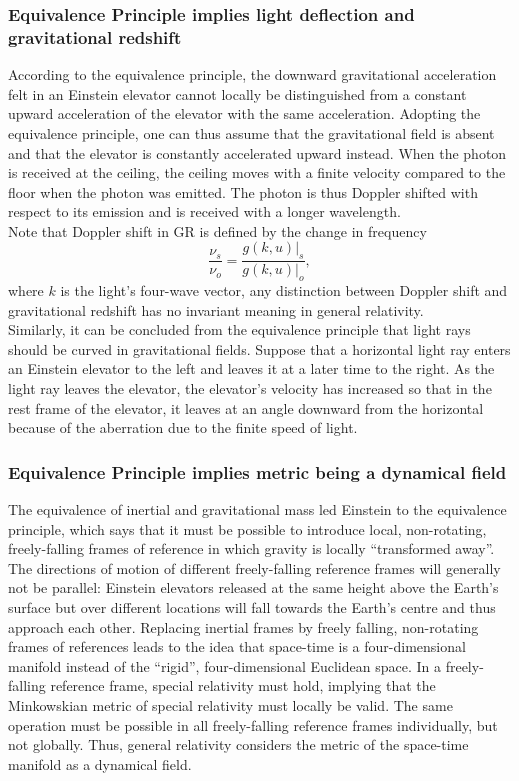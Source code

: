 \subsubsection{Equivalence Principle implies light deflection and gravitational redshift}
According to the equivalence principle, the downward gravitational acceleration felt in an
Einstein elevator cannot locally be distinguished from a constant upward acceleration of the
elevator with the same acceleration. Adopting the equivalence principle, one can thus assume
that the gravitational field is absent and that the elevator is constantly accelerated upward instead.
When the photon is received at the ceiling, the ceiling moves with a finite velocity compared to
the floor when the photon was emitted. The photon is thus Doppler shifted with respect to its
emission and is received with a longer wavelength.
\\
Note that Doppler shift in GR is defined by the change in frequency
\begin{equation}
\label{eq:dopplershiftgr}
\frac{\nu_s}{\nu_o} = \frac{g(k, u)|_s}{g(k, u)|_o},
\end{equation}
where $k$ is
the light’s four-wave vector, any distinction between Doppler shift and gravitational redshift has
no invariant meaning in general relativity.\\
Similarly, it can be concluded from the equivalence principle that light rays should be curved in
gravitational fields. Suppose that a horizontal light ray enters an Einstein elevator to the left and
leaves it at a later time to the right. As the light ray leaves the elevator, the elevator’s velocity
has increased so that in the rest frame of the elevator, it leaves at an angle downward from the
horizontal because of the aberration due to the finite speed of light.
\subsubsection{Equivalence Principle implies metric being a dynamical field}
The equivalence of inertial and gravitational mass led Einstein to the equivalence principle,
which says that it must be possible to introduce local, non-rotating, freely-falling frames of
reference in which gravity is locally “transformed away”. The directions of motion of different
freely-falling reference frames will generally not be parallel: Einstein elevators released at the
same height above the Earth’s surface but over different locations will fall towards the Earth’s
centre and thus approach each other. Replacing inertial frames by freely falling, non-rotating
frames of references leads to the idea that space-time is a four-dimensional manifold instead of
the “rigid”, four-dimensional Euclidean space.
In a freely-falling reference frame, special relativity must hold, implying that the Minkowskian
metric of special relativity must locally be valid. The same operation must be possible in all
freely-falling reference frames individually, but not globally. Thus, general relativity considers
the metric of the space-time manifold as a dynamical field.

